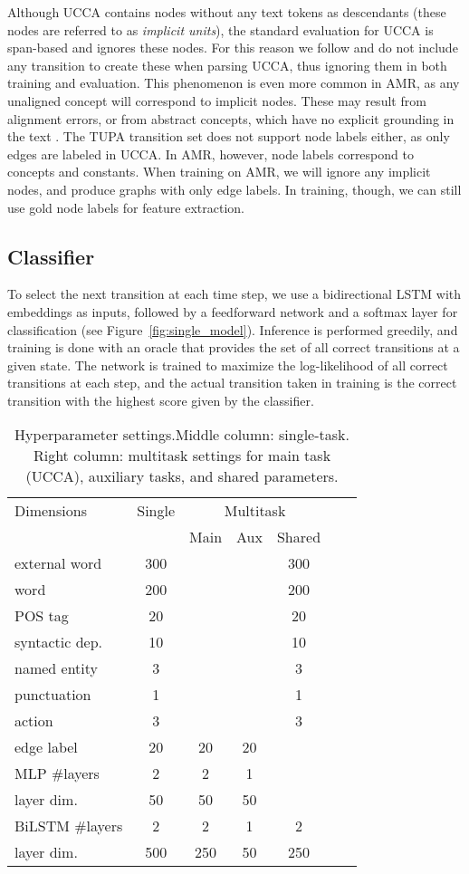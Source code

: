 \documentclass[11pt,a4paper]{article}
\begin{document}
Although UCCA contains nodes without any text tokens as descendants
(these nodes are referred to as \textit{implicit units}),
the standard evaluation for UCCA \cite{abend2013universal} is span-based and
ignores these nodes.
For this reason we follow \citet{hershcovich2017a} and do not include
any transition to create these when parsing UCCA,
thus ignoring them in both training and evaluation.
This phenomenon is even more common in AMR, as any unaligned concept
will correspond to implicit nodes.
These may result from alignment errors,
or from abstract concepts,
which have no explicit grounding in the text \cite{buys2017oxford}.
The TUPA transition set does not support node labels either, as only edges are labeled in UCCA.
In AMR, however, node labels correspond to concepts and constants.
When training on AMR, we will ignore any implicit nodes, and produce graphs with only edge labels.
In training, though, we can still use gold node labels for feature extraction.

\subsection{Classifier}\label{sec:classifier}
To select the next transition at each time step,
we use a bidirectional LSTM with embeddings as inputs,
followed by a feedforward network and a softmax layer for classification (see
Figure~\ref{fig:single_model}).
Inference is performed greedily,
and training is done with an oracle that provides the set of all correct transitions at a given state.
The network is trained to maximize the log-likelihood of all correct transitions at
each step, and the actual transition taken in training is the correct transition
with the highest score given by the classifier.

\begin{table}
\centering
\begin{tabular}{l|c|ccccc}
\footnotesize Dimensions &  \footnotesize Single & \multicolumn{3}{c}{\footnotesize Multitask} \\
&& \footnotesize Main & \footnotesize Aux & \footnotesize Shared \\
\hline
external word & 300 &&& 300 \\
word & 200 &&& 200 \\
POS tag & 20 &&& 20 \\
syntactic dep. & 10 &&& 10 \\
named entity & 3 &&& 3 \\
punctuation & 1 &&& 1 \\
action & 3 &&& 3 \\
edge label & 20 & 20 & 20 \\
MLP \#layers & 2 & 2 & 1 \\
\quad layer dim. & 50 & 50 & 50 \\
BiLSTM \#layers & 2 & 2 & 1 & 2 \\
\quad layer dim. & 500 & 250 & 50 & 250
\end{tabular}
\caption{Hyperparameter settings.\label{tab:hyperparams}
Middle column: single-task.
Right column: multitask settings for main task (UCCA), auxiliary tasks, and shared parameters.}
\end{table}
\end{document}
